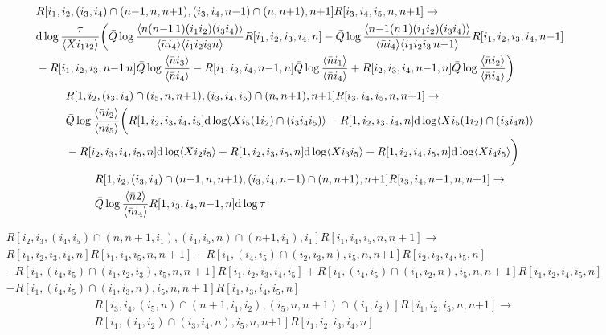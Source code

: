 \documentclass{article}
\begin{document}
\begin{align*}
    &R[i_{1},i_{2},(i_{3},i_{4})\cap(n{-}1,n,n{+1}),(i_{3},i_{4},n{-}1)\cap(n,n{+}1),n{+}1]R[i_{3},i_{4},i_{5},n,n{+}1] \to \\
    &\mathrm{d}\log\frac{\tau}{\langle Xi_{1}i_{2}\rangle}
    \biggl(\bar{Q}\log\frac{\langle n(n{-}1\,1)(i_{1}i_{2})(i_{3}i_{4})\rangle}{\langle \bar{n}i_{4}\rangle\langle i_{1}i_{2}i_{3}n\rangle}R[i_{1},i_{2},i_{3},i_{4},n]-\bar{Q}\log\frac{\langle n{-}1(n\,1)(i_{1}i_{2})(i_{3}i_{4})\rangle}{\langle \bar{n}i_{4}\rangle\langle i_{1}i_{2}i_{3}\,n{-}1\rangle}R[i_{1},i_{2},i_{3},i_{4},n{-}1] \\
    &-R[i_{1},i_{2},i_{3},n{-}1\,n]\bar{Q}\log\frac{\langle\bar{n}i_{3}\rangle}{\langle\bar{n}i_{4}\rangle}-R[i_{1},i_{3},i_{4},n{-}1,n]
    \bar{Q}\log\frac{\langle\bar{n}i_{1}\rangle}{\langle\bar{n}i_{4}\rangle}
    +R[i_{2},i_{3},i_{4},n{-}1,n]\bar{Q}\log\frac{\langle\bar{n}i_{2}\rangle}{\langle\bar{n}i_{4}\rangle}
    \biggr)
\end{align*}
\begin{align*}
    &R[1,i_{2},(i_{3},i_{4})\cap(i_{5},n,n{+1}),(i_{3},i_{4},i_{5})\cap(n,n{+}1),n{+}1]R[i_{3},i_{4},i_{5},n,n{+}1] \to \\
    &\bar{Q}\log\frac{\langle\bar{n}i_{2}\rangle}{\langle\bar{n}i_{5}\rangle}\biggl(R[1,i_{2},i_{3},i_{4},i_{5}]\mathrm{d}\log\langle Xi_{5}(1i_{2})\cap(i_{3}i_{4}i_{5})\rangle -R[1,i_{2},i_{3},i_{4},n]\mathrm{d}\log\langle Xi_{5}(1i_{2})\cap(i_{3}i_{4}n)\rangle \\
    &-R[i_{2},i_{3},i_{4},i_{5},n]\mathrm{d}\log\langle Xi_{2}i_{5}\rangle+R[1,i_{2},i_{3},i_{5},n]\mathrm{d}\log\langle Xi_{3}i_{5}\rangle -R[1,i_{2},i_{4},i_{5},n]\mathrm{d}\log\langle Xi_{4}i_{5}\rangle\biggr)
\end{align*}
\begin{align*}
    &R[1,i_{2},(i_{3},i_{4})\cap(n{-}1,n,n{+1}),(i_{3},i_{4},n{-1})\cap(n,n{+}1),n{+}1]R[i_{3},i_{4},n{-1},n,n{+}1] \to \\
    &\bar{Q}\log\frac{\langle\bar{n}2\rangle}{\langle\bar{n}i_{4}\rangle} R[1,i_{3},i_{4},n{-}1,n]\mathrm{d}\log\tau
\end{align*}

\begin{align*}
  & R[i_{2},i_{3},(i_{4},i_{5})\cap(n,n{+}1,i_{1}),(i_{4},i_{5},n)\cap(n{+1},i_{1}),i_{1}] R[i_{1},i_{4},i_{5},n,n{+}1] \to \\
  &R[i_{1},i_{2},i_{3},i_{4},n]R[i_{1},i_{4},i_{5},n,n{+}1] +
  R[i_{1},(i_{4},i_{5})\cap(i_{2},i_{3},n),i_{5},n,n{+1}]R[i_{2},i_{3},i_{4},i_{5},n] \\
  &-R[i_{1},(i_{4},i_{5})\cap(i_{1},i_{2},i_{3}),i_{5},n,n{+}1]R[i_{1},i_{2},i_{3},i_{4},i_{5}]+R[i_{1},(i_{4},i_{5})\cap(i_{1},i_{2},n),i_{5},n,n{+}1]R[i_{1},i_{2},i_{4},i_{5},n] \\
  &-R[i_{1},(i_{4},i_{5})\cap(i_{1},i_{3},n),i_{5},n,n{+}1]R[i_{1},i_{3},i_{4},i_{5},n]
\end{align*}
\begin{align*}
   & R[i_{3},i_{4},(i_{5},n)\cap(n{+}1,i_{1},i_{2}),(i_{5},n,n{+}1)\cap(i_{1},i_{2})] R[i_{1},i_{2},i_{5},n,n{+1}] \to  \\
    &R[i_{1},(i_{1},i_{2})\cap(i_{3},i_{4},n),i_{5},n,n{+1}]R[i_{1},i_{2},i_{3},i_{4},n]
\end{align*}
\end{document}
